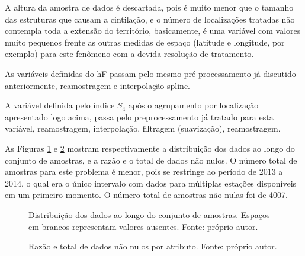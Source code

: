 A altura da amostra de dados é descartada, pois é muito menor que o tamanho das estruturas que causam a cintilação, e o número de localizações tratadas não contempla toda a extensão do território, basicamente, é uma variável com valores muito pequenos frente as outras medidas de espaço (latitude e longitude, por exemplo) para este fenômeno com a devida resolução de tratamento.

As variáveis definidas do hF passam pelo mesmo pré-processamento já discutido anteriormente, reamostragem e interpolação spline.

A variável definida pelo índice $S_4$ após o agrupamento por localização apresentado logo acima, passa pelo preprocessamento já tratado para esta variável, reamostragem, interpolação, filtragem (suavização), reamostragem.

As Figuras \ref{fig:distributionall} e \ref{fig:nulltotalall} mostram respectivamente a distribuição dos dados ao longo do conjunto de amostras, e a razão e o total de dados não nulos. O número total de amostras para este problema é menor, pois se restringe ao período de 2013 a 2014, o qual era o único intervalo com dados para múltiplas estações disponíveis em um primeiro momento. O número total de amostras não nulas foi de 4007.

\begin{figure}[H]
\centering
{}
\caption{Distribuição dos dados ao longo do conjunto de amostras. Espaços em brancos representam valores ausentes. Fonte: próprio autor.}
\label{fig:distributionall}
\end{figure}

\begin{figure}[H]
\centering
{}
\caption{Razão e total de dados não nulos por atributo. Fonte: próprio autor.}
\label{fig:nulltotalall}
\end{figure}

